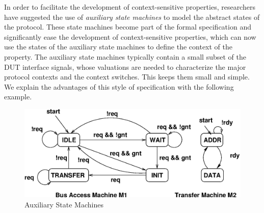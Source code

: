 \documentclass[a4paper, 11pt]{article}
\begin{document}
In order to facilitate the development of context-sensitive
properties, researchers~\cite{pdgbook,dill1} have
suggested the use of {\em auxiliary state machines} to model the abstract 
states of the protocol. These state machines become part of the formal
specification and significantly ease the development of
context-sensitive properties, which can now use the states
of the auxiliary state machines to define the context of the
property. The auxiliary state machines typically contain a
small subset of the DUT interface signals, whose valuations are
needed to characterize the major protocol contexts and the
context switches. This keeps them small and simple. We explain the 
advantages of this style of specification with the following example.

\begin{figure}[htb]
\centering
\includegraphics[scale=0.7]{diag217.eps}
\caption{Auxiliary State Machines} \label{fig1.1}
\end{figure}
\end{document}
